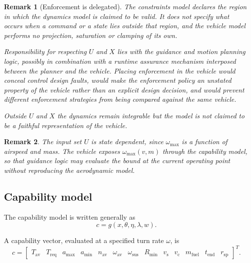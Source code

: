\documentclass[11pt,a4paper]{article}
\newtheorem{remark}{Remark}
\newcommand{\Xset}{X}
\newcommand{\Uset}{U}
\newcommand{\vecx}{x}
\newcommand{\vecw}{w}
\newcommand{\vecc}{c}
\newcommand{\vectheta}{\theta}
\newcommand{\veceta}{\eta}
\newcommand{\veclambda}{\lambda}
\newcommand{\vecg}{g}
\begin{document}
\begin{remark}[Enforcement is delegated]
\label{rem:enforcement}
The constraints model \emph{declares} the region in which the dynamics model is
claimed to be valid. It does not specify what occurs when a command or a state
lies outside that region, and the vehicle model performs no projection,
saturation or clamping of its own.

Responsibility for respecting $\Uset$ and $\Xset$ lies with the guidance and
motion planning logic, possibly in combination with a runtime assurance
mechanism interposed between the planner and the vehicle. Placing enforcement in
the vehicle would conceal control design faults, would make the enforcement
policy an unstated property of the vehicle rather than an explicit design
decision, and would prevent different enforcement strategies from being compared
against the same vehicle.

Outside $\Uset$ and $\Xset$ the dynamics remain integrable but the model is not
claimed to be a faithful representation of the vehicle.
\end{remark}

\begin{remark}
The input set $\Uset$ is state dependent, since $\omega_{\max}$ is a function of
airspeed and mass. The vehicle exposes $\omega_{\max}(v,m)$ through the
capability model, so that guidance logic may evaluate the bound at the current
operating point without reproducing the aerodynamic model.
\end{remark}

\subsection{Capability model}

The capability model is written generally as
\begin{equation}
  \vecc = \vecg(\vecx, \vectheta, \veceta, \veclambda, \vecw).
  \label{eq:capability-general}
\end{equation}

A capability vector, evaluated at a specified turn rate $\omega$, is
\begin{equation}
  \vecc = \begin{bmatrix}
    T_{\mathrm{av}} & T_{\mathrm{req}} &
    a_{\max} & a_{\min} &
    n_{\mathrm{av}} & \omega_{\mathrm{av}} & \omega_{\mathrm{sus}} & R_{\min} &
    v_{\mathrm{s}} & v_{\mathrm{c}} &
    m_{\mathrm{fuel}} & t_{\mathrm{end}} & r_{\mathrm{sp}}
  \end{bmatrix}^{T}.
  \label{eq:c}
\end{equation}
\end{document}
